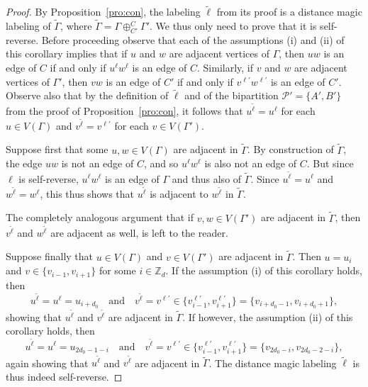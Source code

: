\documentclass[11 pt,english]{article}
\newcommand{\ZZ}{\mathbb{Z}}
\newcommand{\G}{\Gamma}
\theoremstyle{definition}
\begin{document}
\begin{proof}
By Proposition~\ref{pro:con}, the labeling $\tilde{\ell}$ from its proof is a distance magic labeling of $\tilde{\G}$, where $\tilde{\G} = \G\oplus^{C}_{C'} \G'$. We thus only need to prove that it is self-reverse. Before proceeding observe that each of the assumptions (i) and (ii) of this corollary implies that if $u$ and $w$ are adjacent vertices of $\G$, then $u w$ is an edge of $C$ if and only if $u^\ell w^\ell$ is an edge of $C$. Similarly, if $v$ and $w$ are adjacent vertices of $\G'$, then $v w$ is an edge of $C'$ if and only if $v^{\ell'} w^{\ell'}$ is an edge of $C'$. Observe also that by the definition of $\tilde{\ell}$ and of the bipartition $\mathcal{P}' = \{A', B'\}$ from the proof of Proposition~\ref{pro:con}, it follows that $u^{\tilde{\ell}} = u^\ell$ for each $u \in V(\G)$ and $v^{\tilde{\ell}} = v^{\ell'}$ for each $v \in V(\G')$.

Suppose first that some $u, w \in V(\G)$ are adjacent in $\tilde{\G}$. By construction of $\tilde{\G}$, the edge $u w$ is not an edge of $C$, and so $u^\ell w^\ell$ is also not an edge of $C$. But since $\ell$ is self-reverse, $u^\ell w^\ell$ is an edge of $\G$ and thus also of $\tilde{\G}$. Since $u^{\tilde{\ell}} = u^\ell$ and $w^{\tilde{\ell}} = w^\ell$, this thus shows that $u^{\tilde{\ell}}$ is adjacent to $w^{\tilde{\ell}}$ in $\tilde{\G}$. 

The completely analogous argument that if $v,w \in V(\G')$ are adjacent in $\tilde{\G}$, then $v^{\tilde{\ell}}$ and $w^{\tilde{\ell}}$ are adjacent as well, is left to the reader. 

Suppose finally that $u \in V(\G)$ and $v \in V(\G')$ are adjacent in $\tilde{\G}$. Then $u = u_i$ and $v \in \{v_{i-1}, v_{i+1}\}$ for some $i \in \ZZ_d$. If the assumption (i) of this corollary holds, then 
$$
	u^{\tilde{\ell}} = u^\ell = u_{i+d_0} \quad \text{and} \quad v^{\tilde{\ell}} = v^{\ell'} \in \{v_{i-1}^{\ell'}, v_{i+1}^{\ell'}\} = \{v_{i+d_0 - 1}, v_{i+d_0 + 1}\},
$$
showing that $u^{\tilde{\ell}}$ and $v^{\tilde{\ell}}$ are adjacent in $\tilde{\G}$. If however, the assumption (ii) of this corollary holds, then
$$
	u^{\tilde{\ell}} = u^\ell = u_{2d_0-1-i} \quad \text{and} \quad v^{\tilde{\ell}} = v^{\ell'} \in \{v_{i-1}^{\ell'}, v_{i+1}^{\ell'}\} = \{v_{2d_0 - i}, v_{2d_0 -2 - i}\},
$$
again showing that $u^{\tilde{\ell}}$ and $v^{\tilde{\ell}}$ are adjacent in $\tilde{\G}$. The distance magic labeling $\tilde{\ell}$ is thus indeed self-reverse.
\end{proof}
 
\end{document}

